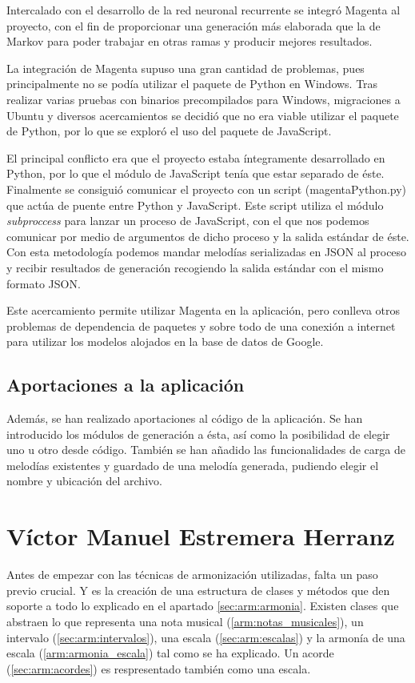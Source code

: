 Intercalado con el desarrollo de la red neuronal recurrente se integró Magenta al proyecto, con el fin de proporcionar una generación más elaborada que la de Markov para poder trabajar en otras ramas y producir mejores resultados. 

La integración de Magenta supuso una gran cantidad de problemas, pues principalmente no se podía utilizar el paquete de Python en Windows. Tras realizar varias pruebas con binarios precompilados para Windows, migraciones a Ubuntu y diversos acercamientos se decidió que no era viable utilizar el paquete de Python, por lo que se exploró el uso del paquete de JavaScript.

El principal conflicto era que el proyecto estaba íntegramente desarrollado en Python, por lo que el módulo de JavaScript tenía que estar separado de éste. Finalmente se consiguió comunicar el proyecto con un script (magentaPython.py) que actúa de puente entre Python y JavaScript. Este script utiliza el módulo \textit{subproccess} para lanzar un proceso de JavaScript, con el que nos podemos comunicar por medio de argumentos de dicho proceso y la salida estándar de éste. Con esta metodología podemos mandar melodías serializadas en JSON al proceso y recibir resultados de generación recogiendo la salida estándar con el mismo formato JSON.

Este acercamiento permite utilizar Magenta en la aplicación, pero conlleva otros problemas de dependencia de paquetes y sobre todo de una conexión a internet para utilizar los modelos alojados en la base de datos de Google.

\subsection*{Aportaciones a la aplicación}
Además, se han realizado aportaciones al código de la aplicación. Se han introducido los módulos de generación a ésta, así como la posibilidad de elegir uno u otro desde código. También se han añadido las funcionalidades de carga de melodías existentes y guardado de una melodía generada, pudiendo elegir el nombre y ubicación del archivo.

\section*{Víctor Manuel Estremera Herranz}

Antes de empezar con las técnicas de armonización utilizadas, falta un paso previo crucial. Y es la creación de una estructura de clases y métodos que den soporte a todo lo explicado en el apartado \ref{sec:arm:armonia}. Existen clases que abstraen lo que representa una nota musical (\ref{arm:notas_musicales}), un intervalo (\ref{sec:arm:intervalos}), una escala (\ref{sec:arm:escalas}) y la armonía de una escala (\ref{arm:armonia_escala}) tal como se ha explicado. Un acorde (\ref{sec:arm:acordes}) es respresentado también como una escala. 

